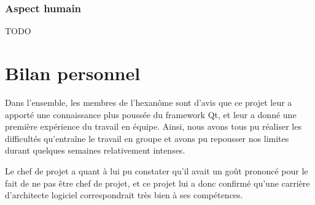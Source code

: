 \subsubsection{Aspect humain}
{\huge TODO}

\section{Bilan personnel}
Dans l'ensemble, les membres de l'hexanôme sont d'avis que ce projet leur a apporté une connaissance plus poussée du framework Qt, et leur a donné une première expérience du travail en équipe. Ainsi, nous avons tous pu réaliser les difficultés qu'entraîne le travail en groupe et avons pu repousser nos limites durant quelques semaines relativement intenses.

Le chef de projet a quant à lui pu constater qu'il avait un goût prononcé pour le fait de ne pas être chef de projet, et ce projet lui a donc confirmé qu'une carrière d'architecte logiciel correspondrait très bien à ses compétences.

